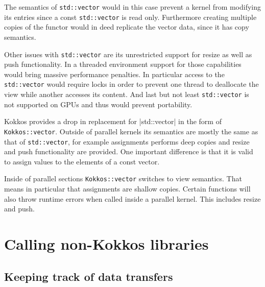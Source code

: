 The semantics of \lstinline|std::vector| would in this case prevent a kernel from modifying its 
entries since a const \lstinline|std::vector| is read only. Furthermore creating multiple copies
of the functor would in deed replicate the vector data, since it has copy semantics.

Other issues with \lstinline|std::vector| are its unrestricted support for resize as well as push 
functionality. In a threaded environment support for those capabilities would bring
massive performance penalties. In particular access to the \lstinline|std::vector| would require
locks in order to prevent one thread to deallocate the view while another accesses its content.
And last but not least \lstinline|std::vector| is not supported on GPUs and thus would prevent
portability. 
 
Kokkos provides a drop in replacement for |std::vector| in the form of \lstinline|Kokkos::vector|.
Outside of parallel kernels its semantics are mostly the same as that of \lstinline|std::vector|, for
example assignments performs deep copies and resize and push functionality are provided.
One important difference is that it is valid to assign values to the elements of a const vector.

Inside of parallel sections \lstinline|Kokkos::vector| switches to view semantics. That means
in particular that assignments are shallow copies. Certain functions will also throw runtime 
errors when called inside a parallel kernel. This includes resize and push. 

\section{Calling non-Kokkos libraries}

\subsection{Keeping track of data transfers}

 
